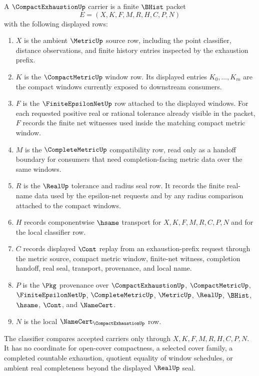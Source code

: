 \begin{definition}
\label{def:compact-exhaustion-carrier}
A $\CompactExhaustionUp$ carrier is a finite $\BHist$ packet
$$
E=(X,K,F,M,R,H,C,P,N)
$$
with the following displayed rows:
\begin{enumerate}
\item $X$ is the ambient $\MetricUp$ source row, including the point classifier, distance observations, and finite history entries inspected by the exhaustion prefix.
\item $K$ is the $\CompactMetricUp$ window row. Its displayed entries $K_0,\ldots,K_m$ are the compact windows currently exposed to downstream consumers.
\item $F$ is the $\FiniteEpsilonNetUp$ row attached to the displayed windows. For each requested positive real or rational tolerance already visible in the packet, $F$ records the finite net witnesses used inside the matching compact metric window.
\item $M$ is the $\CompleteMetricUp$ compatibility row, read only as a handoff boundary for consumers that need completion-facing metric data over the same windows.
\item $R$ is the $\RealUp$ tolerance and radius seal row. It records the finite real-name data used by the epsilon-net requests and by any radius comparison attached to the compact windows.
\item $H$ records componentwise $\hsame$ transport for $X,K,F,M,R,C,P,N$ and for the local classifier row.
\item $C$ records displayed $\Cont$ replay from an exhaustion-prefix request through the metric source, compact metric window, finite-net witness, completion handoff, real seal, transport, provenance, and local name.
\item $P$ is the $\Pkg$ provenance over $\CompactExhaustionUp$, $\CompactMetricUp$, $\FiniteEpsilonNetUp$, $\CompleteMetricUp$, $\MetricUp$, $\RealUp$, $\BHist$, $\hsame$, $\Cont$, and $\NameCert$.
\item $N$ is the local $\NameCert_{\CompactExhaustionUp}$ row.
\end{enumerate}
The classifier compares accepted carriers only through $X,K,F,M,R,H,C,P,N$. It has no coordinate for open-cover compactness, a selected cover family, a completed countable exhaustion, quotient equality of window schedules, or ambient real completeness beyond the displayed $\RealUp$ seal.
\end{definition}

